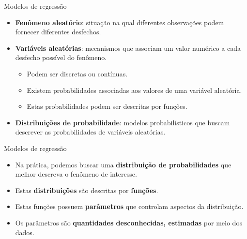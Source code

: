 \documentclass[
  ignorenonframetext,
  serif,
  professionalfont,
  usenames,
  dvipsnames,
  aspectratio = 169]{beamer}
\begin{document}
\begin{frame}{Modelos de regressão}
\protect\hypertarget{modelos-de-regressuxe3o-1}{}
\begin{itemize}
    \itemsep 2ex

  \item \textbf{Fenômeno aleatório}: situação na qual diferentes observações podem fornecer diferentes desfechos. 
  
  \item \textbf{Variáveis aleatórias}: mecanismos que associam um valor numérico a cada desfecho possível do fenômeno. 
  
  \begin{itemize}
    \item Podem ser discretas ou contínuas.
    \item Existem probabilidades associadas aos valores de uma variável aleatória.
    \item Estas probabilidades podem ser descritas por funções.
  \end{itemize}

  \item \textbf{Distribuições de probabilidade}: modelos probabilísticos que buscam descrever as probabilidades de variáveis aleatórias.

  \end{itemize}
\end{frame}

\begin{frame}{Modelos de regressão}
\protect\hypertarget{modelos-de-regressuxe3o-2}{}
\begin{itemize}
    \itemsep 2ex
  
  \item Na prática, podemos buscar uma \textbf{distribuição de probabilidades} que melhor descreva o fenômeno de interesse. 
  
  \item Estas \textbf{distribuições} são descritas por \textbf{funções}. 
  
  \item Estas funções possuem \textbf{parâmetros} que controlam aspectos da distribuição.
  
  \item Os parâmetros são \textbf{quantidades desconhecidas, estimadas} por meio dos dados.
  
  \end{itemize}
\end{frame}
\end{document}
